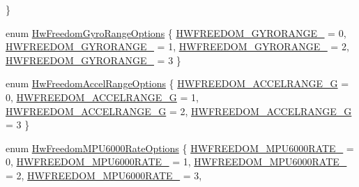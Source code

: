 \begin{DoxyCompactItemize}
 \}
\item 
enum \hyperlink{group___hw_freedom_gae4aebbd0214298843a5513723eedd515}{\-Hw\-Freedom\-Gyro\-Range\-Options} \{ \hyperlink{group___hw_freedom_ggae4aebbd0214298843a5513723eedd515a40331d33e7e14ee1251c617f91b2fe02}{\-H\-W\-F\-R\-E\-E\-D\-O\-M\-\_\-\-G\-Y\-R\-O\-R\-A\-N\-G\-E\-\_} = 0, 
\hyperlink{group___hw_freedom_ggae4aebbd0214298843a5513723eedd515a59e72ee2e12feacabec4b50d920252dc}{\-H\-W\-F\-R\-E\-E\-D\-O\-M\-\_\-\-G\-Y\-R\-O\-R\-A\-N\-G\-E\-\_} = 1, 
\hyperlink{group___hw_freedom_ggae4aebbd0214298843a5513723eedd515aca2c41e136727d95567eece549750016}{\-H\-W\-F\-R\-E\-E\-D\-O\-M\-\_\-\-G\-Y\-R\-O\-R\-A\-N\-G\-E\-\_} = 2, 
\hyperlink{group___hw_freedom_ggae4aebbd0214298843a5513723eedd515ab421e8a8bf14ee1cf56885938031e97f}{\-H\-W\-F\-R\-E\-E\-D\-O\-M\-\_\-\-G\-Y\-R\-O\-R\-A\-N\-G\-E\-\_} = 3
 \}
\item 
enum \hyperlink{group___hw_freedom_ga9d5f897ec64e24063ed5d297ec3ac65e}{\-Hw\-Freedom\-Accel\-Range\-Options} \{ \hyperlink{group___hw_freedom_gga9d5f897ec64e24063ed5d297ec3ac65ea81cb2b6dab1e5b420b67201228593a82}{\-H\-W\-F\-R\-E\-E\-D\-O\-M\-\_\-\-A\-C\-C\-E\-L\-R\-A\-N\-G\-E\-\_\-G} = 0, 
\hyperlink{group___hw_freedom_gga9d5f897ec64e24063ed5d297ec3ac65eaff0e30050c243d66d2a4a0dfd5631143}{\-H\-W\-F\-R\-E\-E\-D\-O\-M\-\_\-\-A\-C\-C\-E\-L\-R\-A\-N\-G\-E\-\_\-G} = 1, 
\hyperlink{group___hw_freedom_gga9d5f897ec64e24063ed5d297ec3ac65eab558b8c32f540762a599d7feea090f78}{\-H\-W\-F\-R\-E\-E\-D\-O\-M\-\_\-\-A\-C\-C\-E\-L\-R\-A\-N\-G\-E\-\_\-G} = 2, 
\hyperlink{group___hw_freedom_gga9d5f897ec64e24063ed5d297ec3ac65eae306ccee51815fd1641a0cd7f7851f7e}{\-H\-W\-F\-R\-E\-E\-D\-O\-M\-\_\-\-A\-C\-C\-E\-L\-R\-A\-N\-G\-E\-\_\-G} = 3
 \}
\item 
enum \hyperlink{group___hw_freedom_gadb25584ed522ded9503d1861ba57104b}{\-Hw\-Freedom\-M\-P\-U6000\-Rate\-Options} \{ \*
\hyperlink{group___hw_freedom_ggadb25584ed522ded9503d1861ba57104ba2e8ddf974604d2a4229cbd9a6d7b62eb}{\-H\-W\-F\-R\-E\-E\-D\-O\-M\-\_\-\-M\-P\-U6000\-R\-A\-T\-E\-\_} = 0, 
\hyperlink{group___hw_freedom_ggadb25584ed522ded9503d1861ba57104baf9990c4a47a803fd410542d6b7bf028f}{\-H\-W\-F\-R\-E\-E\-D\-O\-M\-\_\-\-M\-P\-U6000\-R\-A\-T\-E\-\_} = 1, 
\hyperlink{group___hw_freedom_ggadb25584ed522ded9503d1861ba57104ba33e4a79862fbefe6f5cb498e87fb823a}{\-H\-W\-F\-R\-E\-E\-D\-O\-M\-\_\-\-M\-P\-U6000\-R\-A\-T\-E\-\_} = 2, 
\hyperlink{group___hw_freedom_ggadb25584ed522ded9503d1861ba57104ba3380ebbb052b0013c738a71f798cadcd}{\-H\-W\-F\-R\-E\-E\-D\-O\-M\-\_\-\-M\-P\-U6000\-R\-A\-T\-E\-\_} = 3, 

\end{DoxyCompactItemize}
